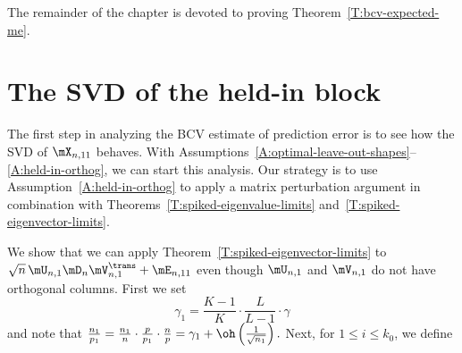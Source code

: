 The remainder of the chapter is devoted to proving Theorem~\ref{T:bcv-expected-me}.


\section{The SVD of the held-in block}\label{S:bcv-theory-holdin}

The first step in analyzing the BCV estimate of prediction error is to see how the SVD of $\mX_{n,11}$ behaves.  With Assumptions~\ref{A:optimal-leave-out-shapes}--\ref{A:held-in-orthog}, we can start this analysis.  Our strategy is to use Assumption~\ref{A:held-in-orthog} to apply a matrix perturbation argument in combination with Theorems~\ref{T:spiked-eigenvalue-limits} and~\ref{T:spiked-eigenvector-limits}.

We show that we can apply Theorem~\ref{T:spiked-eigenvector-limits} to 
$\sqrt{n} \, \mU_{n,1} \mD_n \mV_{n,1}^\trans + \mE_{n,11}$ even though $\mU_{n,1}$ and $\mV_{n,1}$ do not have orthogonal columns.  First we set
\begin{equation}
	\gamma_1
		= 
		\frac{K-1}{K}
		\cdot
		\frac{L}{L-1}
		\cdot
		\gamma
\end{equation}
and note that 
\(
	\frac{n_1}{p_1} 
		= 
		\frac{n_1}{n} \cdot \frac{p}{p_1} \cdot \frac{n}{p}
		=
		\gamma_1 + \oh\left( \frac{1}{\sqrt{n_1}} \right).
\)
Next, for $1 \leq i \leq k_0$, we define
